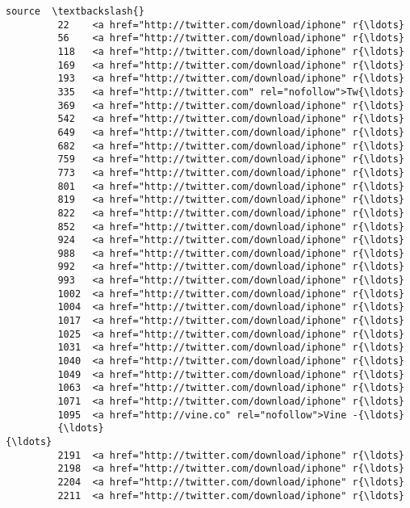 \documentclass[11pt]{article}
\begin{document}
\begin{Verbatim}[commandchars=\\\{\}]
                                                          source  \textbackslash{}
         22    <a href="http://twitter.com/download/iphone" r{\ldots}   
         56    <a href="http://twitter.com/download/iphone" r{\ldots}   
         118   <a href="http://twitter.com/download/iphone" r{\ldots}   
         169   <a href="http://twitter.com/download/iphone" r{\ldots}   
         193   <a href="http://twitter.com/download/iphone" r{\ldots}   
         335   <a href="http://twitter.com" rel="nofollow">Tw{\ldots}   
         369   <a href="http://twitter.com/download/iphone" r{\ldots}   
         542   <a href="http://twitter.com/download/iphone" r{\ldots}   
         649   <a href="http://twitter.com/download/iphone" r{\ldots}   
         682   <a href="http://twitter.com/download/iphone" r{\ldots}   
         759   <a href="http://twitter.com/download/iphone" r{\ldots}   
         773   <a href="http://twitter.com/download/iphone" r{\ldots}   
         801   <a href="http://twitter.com/download/iphone" r{\ldots}   
         819   <a href="http://twitter.com/download/iphone" r{\ldots}   
         822   <a href="http://twitter.com/download/iphone" r{\ldots}   
         852   <a href="http://twitter.com/download/iphone" r{\ldots}   
         924   <a href="http://twitter.com/download/iphone" r{\ldots}   
         988   <a href="http://twitter.com/download/iphone" r{\ldots}   
         992   <a href="http://twitter.com/download/iphone" r{\ldots}   
         993   <a href="http://twitter.com/download/iphone" r{\ldots}   
         1002  <a href="http://twitter.com/download/iphone" r{\ldots}   
         1004  <a href="http://twitter.com/download/iphone" r{\ldots}   
         1017  <a href="http://twitter.com/download/iphone" r{\ldots}   
         1025  <a href="http://twitter.com/download/iphone" r{\ldots}   
         1031  <a href="http://twitter.com/download/iphone" r{\ldots}   
         1040  <a href="http://twitter.com/download/iphone" r{\ldots}   
         1049  <a href="http://twitter.com/download/iphone" r{\ldots}   
         1063  <a href="http://twitter.com/download/iphone" r{\ldots}   
         1071  <a href="http://twitter.com/download/iphone" r{\ldots}   
         1095  <a href="http://vine.co" rel="nofollow">Vine -{\ldots}   
         {\ldots}                                                 {\ldots}   
         2191  <a href="http://twitter.com/download/iphone" r{\ldots}   
         2198  <a href="http://twitter.com/download/iphone" r{\ldots}   
         2204  <a href="http://twitter.com/download/iphone" r{\ldots}   
         2211  <a href="http://twitter.com/download/iphone" r{\ldots}   

\end{Verbatim}
\end{document}
